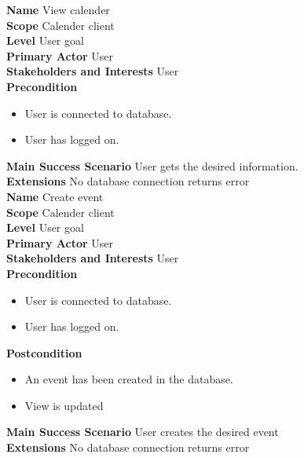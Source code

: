 \documentclass[a4paper,10pt,titlepage]{article}
\begin{document}
	\textbf{Name}
	View calender
	\\
	\textbf{Scope}
	Calender client
	\\
	\textbf{Level}
	User goal
	\\
	\textbf{Primary Actor}
	User
	\\
	\textbf{Stakeholders and Interests}
	User
	\\
	\textbf{Precondition}
		\begin{itemize}
		\item User is connected to database.
		\item User has logged on.
		\end{itemize}
	\textbf{Main Success Scenario}
	User gets the desired information.
	\\
	\textbf{Extensions}
	No database connection returns error
	\\
	
	\textbf{Name}
	Create event
	\\
	\textbf{Scope}
	Calender client
	\\
	\textbf{Level}
	User goal
	\\
	\textbf{Primary Actor}
	User
	\\
	\textbf{Stakeholders and Interests}
	User
	\\
	\textbf{Precondition}
		\begin{itemize}
		\item User is connected to database.
		\item User has logged on.
		\end{itemize}
	\textbf{Postcondition}
	\begin{itemize}
			\item An event has been created in the database.
			\item View is updated
	\end{itemize}
	\textbf{Main Success Scenario}
	User creates the desired event
	\\
	\textbf{Extensions}
	No database connection returns error
	\\
	
\end{document}
